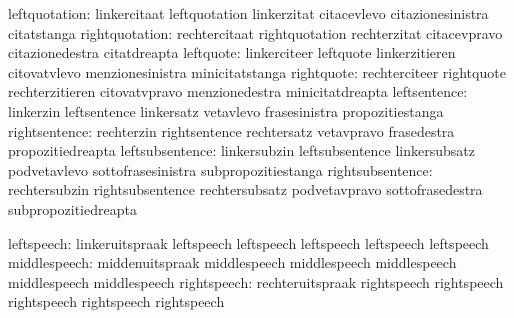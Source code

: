             leftquotation: linkercitaat              leftquotation
                           linkerzitat               citacevlevo
                           citazionesinistra         citatstanga
           rightquotation: rechtercitaat             rightquotation
                           rechterzitat              citacevpravo
                           citazionedestra           citatdreapta
                leftquote: linkerciteer              leftquote
                           linkerzitieren            citovatvlevo
                           menzionesinistra          minicitatstanga
               rightquote: rechterciteer             rightquote
                           rechterzitieren           citovatvpravo
                           menzionedestra            minicitatdreapta
             leftsentence: linkerzin                 leftsentence
                           linkersatz                vetavlevo
                           frasesinistra             propozitiestanga
            rightsentence: rechterzin                rightsentence
                           rechtersatz               vetavpravo
                           frasedestra               propozitiedreapta
          leftsubsentence: linkersubzin              leftsubsentence
                           linkersubsatz             podvetavlevo
                           sottofrasesinistra        subpropozitiestanga
         rightsubsentence: rechtersubzin             rightsubsentence
                           rechtersubsatz            podvetavpravo
                           sottofrasedestra          subpropozitiedreapta

               leftspeech: linkeruitspraak           leftspeech 
                           leftspeech                leftspeech 
                           leftspeech                leftspeech %
             middlespeech: middenuitspraak           middlespeech 
                           middlespeech              middlespeech 
                           middlespeech              middlespeech %
              rightspeech: rechteruitspraak          rightspeech 
                           rightspeech               rightspeech 
                           rightspeech               rightspeech %

